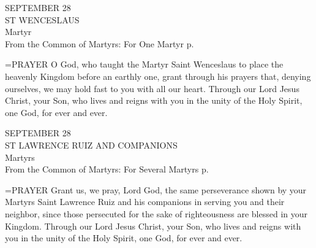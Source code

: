 \begin{center}\normalsize SEPTEMBER 28\\
\footnotesize ST WENCESLAUS \\
\footnotesize Martyr\\
\footnotesize From the Common of Martyrs: For One Martyr p.\\
\end{center}

\hangindent=\parindent \small{PRAYER 
O God, who taught the Martyr Saint Wenceslaus
to place the heavenly Kingdom before an earthly one,
grant through his prayers that, denying ourselves,
we may hold fast to you with all our heart.
Through our Lord Jesus Christ, your Son,
who lives and reigns with you in the unity of the Holy Spirit,
one God, for ever and ever.\\}
 
\begin{center}\normalsize SEPTEMBER 28\\
\footnotesize ST LAWRENCE RUIZ AND COMPANIONS\\
\footnotesize Martyrs\\
\footnotesize From the Common of Martyrs: For Several Martyrs p.\\
\end{center}

\hangindent=\parindent \small{PRAYER 
Grant us, we pray, Lord God,
the same perseverance shown by your Martyrs
Saint Lawrence Ruiz and his companions
in serving you and their neighbor,
since those persecuted for the sake of righteousness
are blessed in your Kingdom.
Through our Lord Jesus Christ, your Son,
who lives and reigns with you in the unity of the Holy Spirit,
one God, for ever and ever.\\}
 

